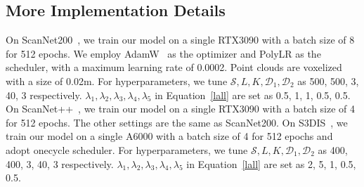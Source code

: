 \subsection{More Implementation Details}
On ScanNet200~\cite{rozenberszki2022language}, we train our model on a single RTX3090 with a batch size of 8 for 512 epochs. 
%
We employ AdamW~\cite{loshchilov2017decoupled} as the optimizer and PolyLR as the scheduler, with a maximum learning rate of 0.0002.
%
Point clouds are voxelized with a size of 0.02m.
%
For hyperparameters, we tune $\mathcal{S}, L, K, \mathcal{D}_1, \mathcal{D}_2$ as 500, 500, 3, 40, 3 respectively.
$\lambda_1 ,\lambda_2 ,\lambda_3 ,\lambda_4 ,\lambda_5$ in Equation~\ref{lall} are set as 0.5, 1, 1, 0.5, 0.5.
On ScanNet++~\cite{yeshwanth2023scannet++}, we train our model on a single RTX3090 with a batch size of 4 for 512 epochs. The other settings are the same as ScanNet200.
On S3DIS~\cite{armeni20163d}, we train our model on a single A6000 with a batch size of 4 for 512 epochs and adopt onecycle scheduler.
For hyperparameters, we tune $\mathcal{S}, L, K, \mathcal{D}_1, \mathcal{D}_2$ as 400, 400, 3, 40, 3 respectively.
$\lambda_1 ,\lambda_2 ,\lambda_3 ,\lambda_4 ,\lambda_5$ in Equation~\ref{lall} are set as 2, 5, 1, 0.5, 0.5.
